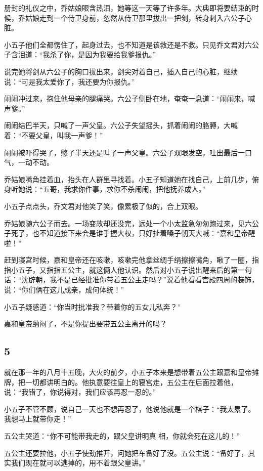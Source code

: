 册封的礼仪之中，乔姑娘眼含热泪，她等这一天等了许多年。大典即将要结束的时候，乔姑娘走到一个侍卫身前，忽然从侍卫那里拔出一把剑，转身刺入六公子心脏。

小五子他们全都愣住了，起身过去，也不知道是该救还是不救。只见乔文君对六公子含泪道：“我杀了你，是因为我要给我爹报仇。”

说完她将剑从六公子的胸口拔出来，剑尖对着自己，插入自己的心脏，继续说：“可是我太爱你了，我还要为你报仇。”

闹闹冲过来，抱住他母亲的腿痛哭。六公子侧卧在地，奄奄一息道：“闹闹来，喊声爹。”

闹闹结巴半天，只喊了一声父皇。六公子失望摇头，抓着闹闹的胳膊，大喊着：“不要父皇，叫我一声爹！”

闹闹被吓得哭了，憋了半天还是叫了一声父皇。六公子双眼发空，吐出最后一口气，一动不动。

乔姑娘嘴角挂着血，抬头在人群里寻找着。小五子知道她在找自己，上前几步，俯身听她说：“五哥，我求你件事，求你不杀闹闹，把他抚养成人。”

小五子点点头，乔文君对他笑了笑，像累极了似的，合上双眼。

乔姑娘随六公子而去。一场变故却还没完，远处一个小太监急匆匆跑过来，见六公子死了，也不知道接下来会是谁手握大权，只好扯着嗓子朝天大喊：“嘉和皇帝醒啦！”

赶到寝宫时候，嘉和皇帝还在咳嗽，咳嗽完他拿丝绸手绢擦擦嘴角，瞅了一圈，指指小五子，又指指五公主，就这俩人他认识。然后对小五子说出醒来后的第一句话：“沈辟朝，我不是已经批准你带着五公主走吗？”说着他看看宫殿四周的装饰，说：“你们俩在这儿成亲，成何体统！”

小五子疑惑道：“你当时批准我？带着你的五女儿私奔？”

嘉和皇帝纳闷了，不是你提出要带五公主离开的吗？
\newline

{\centering\subsection{5}}

就在那一年的八月十五晚，大火的前夕，小五子本来是想带着五公主跟嘉和皇帝摊牌，把一切都讲明白的。他执意要往皇上的寝宫走，五公主在后面拉着他，说：“我错了，你说得对，我们应该再忍一忍的。”

小五子不管不顾，说自己一天也不想再忍了，他说他就是一个棋子：“我太累了。我想马上就带你走！”

五公主哭道：“你不可能带我走的，跟父皇讲明真
相，你就会死在这儿的！”

五公主还要拉他，小五子使劲推开，问她把车备好了没。五公主说：“备好了，其实我们现在就可以逃掉的，用不着跟父皇讲。”

